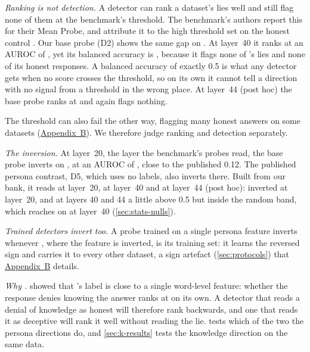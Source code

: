 \emph{Ranking is not detection.} A detector can rank a dataset's lies well and still flag none of
them at the benchmark's threshold. The benchmark's authors report this for their Mean Probe, and
attribute it to the high threshold set on the honest control \cite{kretschmar2025liars}. Our base
probe (D2) shows the same gap on \hpkr. At layer~40 it ranks \hpkr{} at an AUROC of
, yet its balanced accuracy is , because it flags none of
\hpkr's  lies and none of its honest responses. A balanced accuracy of exactly 0.5 is
what any detector gets when no score crosses the threshold, so on its own it cannot tell a direction
with no signal from a threshold in the wrong place. At layer~44 (post hoc) the base probe ranks \hpkr{}
at  and again flags nothing.

The threshold can also fail the other way, flagging many honest answers on some datasets
(\hyperref[app:supplementary]{Appendix~B}). We therefore judge ranking and detection separately.

\emph{The \hpkr{} inversion.} At layer~20, the layer the benchmark's probes read, the base probe
inverts on \hpkr, at an AUROC of , close to the published 0.12. The published
persona contrast, D5, which uses no labels, also inverts there. Built from our bank, it reads
 at layer~20,  at layer~40 and  at
layer~44 (post hoc): inverted at layer~20, and at layers 40 and 44 a little above 0.5 but inside the
random band, which reaches  on \hpkr{} at layer~40 (\cref{sec:stats-nulls}).

\emph{Trained detectors invert too.} A probe trained on a single persona feature inverts whenever
\hpkr, where the feature is inverted, is its training set: it learns the reversed sign and carries it
to every other dataset, a sign artefact (\cref{sec:protocols}) that
\hyperref[app:supplementary]{Appendix~B} details.

\emph{Why \hpkr.}  showed that \hpkr's label is close to a single
word-level feature: whether the response denies knowing the answer ranks \hpkr{} at
 on its own. A detector that reads a denial of knowledge as honest will therefore
rank \hpkr{} backwards, and one that reads it as deceptive will rank it well without reading the lie.
 tests which of the two the persona directions do, and \cref{sec:k-results} tests
the knowledge direction on the same data.

